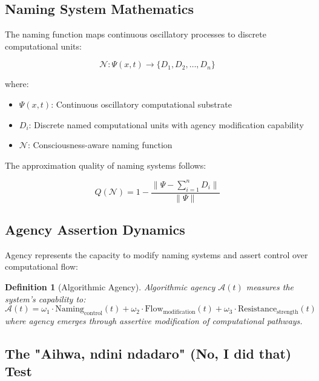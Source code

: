 \documentclass[12pt,a4paper]{article}
\newtheorem{definition}[theorem]{Definition}
\begin{document}
\subsection{Naming System Mathematics}

The naming function maps continuous oscillatory processes to discrete computational units:

\begin{equation}
\mathcal{N}: \Psi(x,t) \rightarrow \{D_1, D_2, \ldots, D_n\}
\end{equation}

where:
\begin{itemize}
\item $\Psi(x,t)$: Continuous oscillatory computational substrate
\item $D_i$: Discrete named computational units with agency modification capability
\item $\mathcal{N}$: Consciousness-aware naming function
\end{itemize}

The approximation quality of naming systems follows:

\begin{equation}
Q(\mathcal{N}) = 1 - \frac{\|\Psi - \sum_{i=1}^{n} D_i\|}{\|\Psi\|}
\end{equation}

\subsection{Agency Assertion Dynamics}

Agency represents the capacity to modify naming systems and assert control over computational flow:

\begin{definition}[Algorithmic Agency]
Algorithmic agency $\mathcal{A}(t)$ measures the system's capability to:
\begin{equation}
\mathcal{A}(t) = \omega_1 \cdot \text{Naming}_{\text{control}}(t) + \omega_2 \cdot \text{Flow}_{\text{modification}}(t) + \omega_3 \cdot \text{Resistance}_{\text{strength}}(t)
\end{equation}
where agency emerges through assertive modification of computational pathways.
\end{definition}

\subsection{The "Aihwa, ndini ndadaro" (No, I did that) Test}
\end{document}
